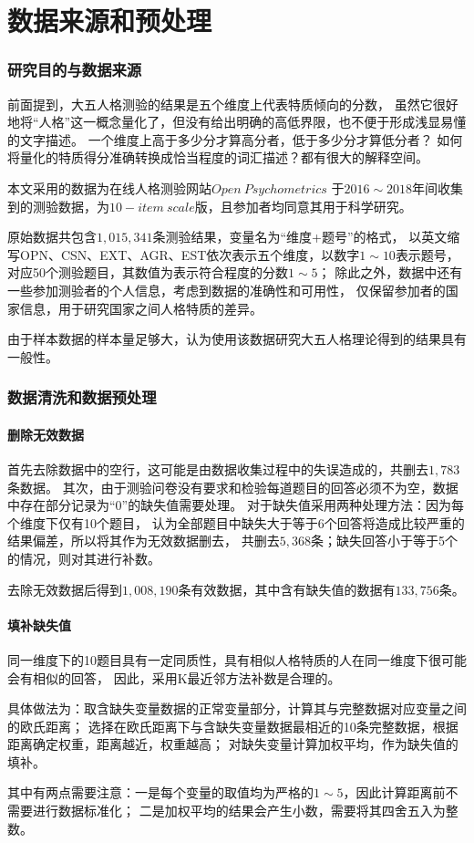 \documentclass[UTF8]{ctexart}
\begin{document}
\part{数据来源和预处理}
\setcounter{section}{0}
\section{研究目的与数据来源}
前面提到，大五人格测验的结果是五个维度上代表特质倾向的分数，
虽然它很好地将“人格”这一概念量化了，但没有给出明确的高低界限，也不便于形成浅显易懂的文字描述。
一个维度上高于多少分才算高分者，低于多少分才算低分者？
如何将量化的特质得分准确转换成恰当程度的词汇描述？都有很大的解释空间。\par
本文采用的数据为在线人格测验网站\href{https://openpsychometrics.org}{$Open\ Psychometrics$}
于$2016\sim2018$年间收集到的测验数据，为$10-item\ scale$版，且参加者均同意其用于科学研究。\par
原始数据共包含$1,015,341$条测验结果，变量名为“维度+题号”的格式，
以英文缩写OPN、CSN、EXT、AGR、EST依次表示五个维度，以数字$1\sim10$表示题号，
对应50个测验题目，其数值为表示符合程度的分数$1\sim5$；
除此之外，数据中还有一些参加测验者的个人信息，考虑到数据的准确性和可用性，
仅保留参加者的国家信息，用于研究国家之间人格特质的差异。\par
由于样本数据的样本量足够大，认为使用该数据研究大五人格理论得到的结果具有一般性。
\section{数据清洗和数据预处理}
\subsection*{删除无效数据}
首先去除数据中的空行，这可能是由数据收集过程中的失误造成的，共删去$1,783$条数据。
其次，由于测验问卷没有要求和检验每道题目的回答必须不为空，数据中存在部分记录为“0”的缺失值需要处理。
对于缺失值采用两种处理方法：因为每个维度下仅有10个题目，
认为全部题目中缺失大于等于6个回答将造成比较严重的结果偏差，所以将其作为无效数据删去，
共删去$5,368$条；缺失回答小于等于5个的情况，则对其进行补数。\par
去除无效数据后得到$1,008,190$条有效数据，其中含有缺失值的数据有$133,756$条。
\subsection*{填补缺失值}
同一维度下的10题目具有一定同质性，具有相似人格特质的人在同一维度下很可能会有相似的回答，
因此，采用K最近邻方法补数是合理的。\par
具体做法为：取含缺失变量数据的正常变量部分，计算其与完整数据对应变量之间的欧氏距离；
选择在欧氏距离下与含缺失变量数据最相近的10条完整数据，根据距离确定权重，距离越近，权重越高；
对缺失变量计算加权平均，作为缺失值的填补。\par
其中有两点需要注意：一是每个变量的取值均为严格的$1\sim5$，因此计算距离前不需要进行数据标准化；
二是加权平均的结果会产生小数，需要将其四舍五入为整数。
\end{document}
